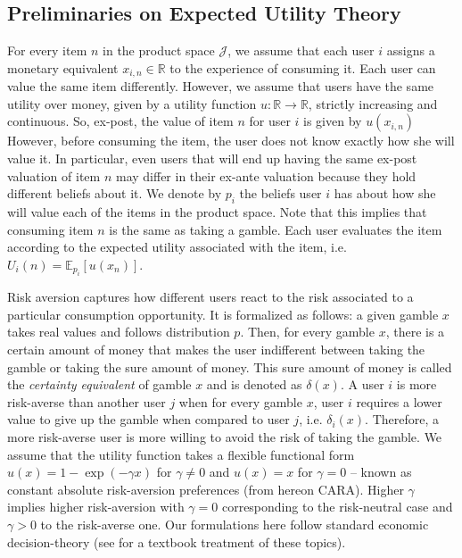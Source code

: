 \documentclass[format=acmsmall, review=false]{acmart}
\begin{document}
\subsection{Preliminaries on Expected Utility Theory}
\noindent For every item $n$ in the product space $\mathcal J$, we assume that each user $i$ assigns a monetary equivalent $x_{i,n} \in \mathbb R$ to the experience of consuming it. Each user can value the same item differently. However, we assume that users have the same utility over money, given by a utility function $u: \mathbb R \to \mathbb R$, strictly increasing and continuous. So, ex-post, the value of item $n$ for user $i$ is given by $u(x_{i,n})$ However, before consuming the item, the user does not know exactly how she will value it. In particular, even users that will end up having the same ex-post valuation of item $n$ may differ in their ex-ante valuation because they hold different beliefs about it. We denote by $p_{i}$ the beliefs user $i$ has about how she will value each of the items in the product space. Note that this implies that consuming item $n$ is the same as taking a gamble. Each user evaluates the item according to the expected utility associated with the item, i.e. $U_i(n)=\mathbb E_{p_i}[u(x_n)]$. 
\par
Risk aversion captures how different users react to the risk associated to a particular consumption opportunity. It is formalized as follows: a given gamble $x$ takes real values and follows distribution $p$. Then, for every gamble $x$, there is a certain amount of money that makes the user indifferent between taking the gamble or taking the sure amount of money. This sure amount of money is called the \textit{certainty equivalent} of gamble $x$ and is denoted as $\delta(x)$. A user $i$ is more risk-averse than another user $j$ when for every gamble $x$, user $i$ requires a lower value to give up the gamble when compared to user $j$, i.e. $\delta_i(x)$. Therefore, a more risk-averse user is more willing to avoid the risk of taking the gamble. We assume that the utility function takes a flexible functional form $u(x)=1-\exp(-\gamma x)$ for $\gamma\ne0$ and $u(x)=x$ for $\gamma=0$ -- known as constant absolute risk-aversion preferences (from hereon CARA). Higher $\gamma$ implies higher risk-aversion with $\gamma=0$ corresponding to the risk-neutral case and $\gamma>0$ to the risk-averse one. Our formulations here follow standard economic decision-theory (see \cite{mas1995microeconomic} for a textbook treatment of these topics).
\par
\end{document}
